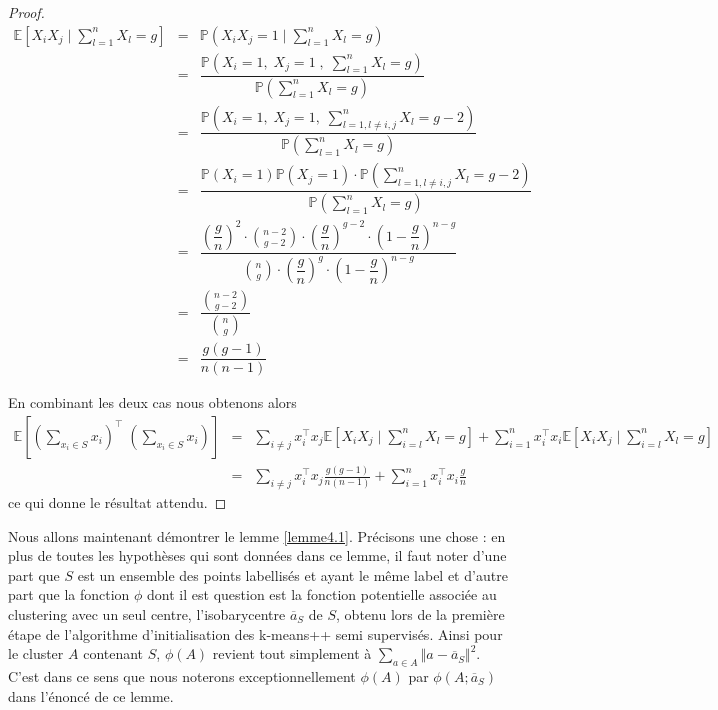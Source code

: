 \documentclass[12pt,a4paper]{book}
\newcommand{\E}{\mathbb{E}}
\newcommand{\p}{\mathbb{P}}
\newcommand{\1}{\mathds{1}}
\begin{document}
\begin{proof}
		\begin{eqnarray*}
			\E \left[ X_i X_j\; | \; \sum_{l=1}^n X_l = g \right] &=& \p \left( X_i X_j = 1 \; | \; \sum_{l=1}^n X_l = g \right) \\
			&=& \dfrac{\p \left( X_i = 1, \; X_j = 1 \; , \; \displaystyle \sum_{l=1}^n X_l = g \right)}{\p \left(\displaystyle \sum_{l=1}^n X_l = g \right)} \\
			&=& \dfrac{\p \left( X_i = 1 , \; X_j = 1 , \; \displaystyle \sum_{l=1, l\neq i,j}^n X_l = g-2 \right)}{\p \left(\displaystyle \sum_{l=1}^n X_l = g \right)} \\
			&=& \dfrac{\p \left( X_i = 1 \right) \p \left( X_j = 1 \right) \cdot \p \left( \displaystyle \sum_{l=1, l\neq i,j}^n X_l = g-2 \right)}{\p \left(\displaystyle \sum_{l=1}^n X_l = g \right)}\\
			&=& \dfrac{\left(\dfrac{g}{n}\right)^2 \cdot \displaystyle {n-2 \choose g-2} \cdot \left(\dfrac{g}{n}\right)^{g-2} \cdot \left(1 - \dfrac{g}{n}\right)^{n-g} } {\displaystyle {n \choose g} \cdot \left(\dfrac{g}{n}\right)^{g} \cdot \left(1 - \dfrac{g}{n}\right)^{n-g} } \\
			&=& \dfrac{\displaystyle {n-2 \choose g-2}} {\displaystyle {n \choose g}} \\
			&=& \dfrac{g(g-1)}{n(n-1)}
		\end{eqnarray*}
		
		En combinant les deux cas nous obtenons alors  
		\begin{eqnarray*}
			\E \left[ \left( \sum_{x_i \in S} x_i \right)^\intercal \; \left( \sum_{x_i \in S} x_i \right) \right] &=& \sum_{ i \neq j} x_i^\intercal x_j \E \left[ X_i X_j \; | \; \sum_{i=l}^n X_l = g \right] + \sum_{i=1}^n x_i^\intercal x_i \E \left[ X_i X_j \; | \; \sum_{i=l}^n X_l = g \right] \\
			&=& \sum_{ i \neq j} x_i^\intercal x_j \frac{g(g-1)}{n(n-1)} + \sum_{i=1}^n x_i^\intercal x_i \frac{g}{n}
		\end{eqnarray*}
		ce qui donne le résultat attendu.
	\end{proof}
	
	Nous allons maintenant démontrer le lemme \ref{lemme4.1}. Précisons une chose : en plus de toutes les hypothèses qui sont données dans ce lemme, il faut noter d'une part que $S$ est un ensemble des points labellisés et ayant le même label et d'autre part que la fonction $\phi$ dont il est question est la fonction potentielle associée au clustering avec un seul centre, l'isobarycentre $\overline{a}_S$ de $S$, obtenu lors de la première étape de l'algorithme d'initialisation des k-means++ semi supervisés. Ainsi pour le cluster $A$ contenant $S$,  $\phi(A)$ revient tout simplement à $\sum_{a \in A} \Vert a - \overline{a}_S \Vert^2$. C'est dans ce sens que nous noterons exceptionnellement   $\phi(A)$ par $\phi\left(A;\overline{a}_S \right)$ dans l'énoncé de ce lemme.
	
\end{document}
